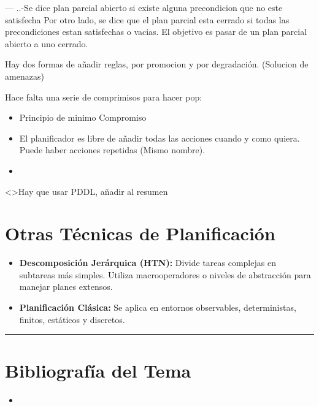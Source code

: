 ---
..-Se dice plan parcial abierto si existe alguna precondicion que no este satisfecha
Por otro lado, se dice que el plan parcial esta cerrado si todas las precondiciones estan satisfechas o vacias.
El objetivo es pasar de un plan parcial abierto a uno cerrado.

Hay dos formas de añadir reglas, por promocion y por degradación. (Solucion de amenazas)

Hace falta una serie de comprimisos para hacer pop:
\begin{itemize}
    \item Principio de minimo Compromiso
    \item El planificador es libre de añadir todas las acciones cuando y como quiera. Puede haber acciones repetidas (Mismo nombre).
    \item 
\end{itemize}
<>Hay que usar PDDL, añadir al resumen



\section{Otras Técnicas de Planificación}
\begin{itemize}
    \item \textbf{Descomposición Jerárquica (HTN):} Divide tareas complejas en subtareas más simples. Utiliza macrooperadores o niveles de abstracción para manejar planes extensos.
    \item \textbf{Planificación Clásica:} Se aplica en entornos observables, deterministas, finitos, estáticos y discretos.
\end{itemize}



\bigskip
\noindent\rule{\textwidth}{0.4pt} 

\section*{Bibliografía del Tema}

\begin{itemize}
    \item
\end{itemize}
\newpage